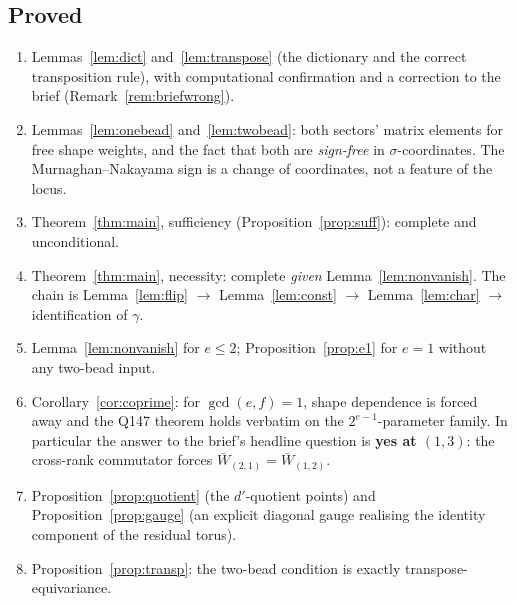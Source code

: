\documentclass[11pt]{article}
\theoremstyle{definition}
\theoremstyle{remark}
\begin{document}
\subsection*{Proved}
\begin{enumerate}
\item Lemmas~\ref{lem:dict} and~\ref{lem:transpose} (the dictionary and the correct
   transposition rule), with computational confirmation and a correction to the brief
   (Remark~\ref{rem:briefwrong}).
\item Lemmas~\ref{lem:onebead} and~\ref{lem:twobead}: both sectors' matrix elements for
   free shape weights, and the fact that both are \emph{sign-free} in
   $\sigma$-coordinates.  The Murnaghan--Nakayama sign is a change of coordinates,
   not a feature of the locus.
\item Theorem~\ref{thm:main}, sufficiency (Proposition~\ref{prop:suff}): complete and
   unconditional.
\item Theorem~\ref{thm:main}, necessity: complete \emph{given} Lemma~\ref{lem:nonvanish}.
   The chain is Lemma~\ref{lem:flip} $\to$ Lemma~\ref{lem:const} $\to$
   Lemma~\ref{lem:char} $\to$ identification of $\gamma$.
\item Lemma~\ref{lem:nonvanish} for $e\le2$; Proposition~\ref{prop:e1} for $e=1$ without
   any two-bead input.
\item Corollary~\ref{cor:coprime}: for $\gcd(e,f)=1$, shape dependence is forced away and
   the Q147 theorem holds verbatim on the $2^{e-1}$-parameter family.  In particular the
   answer to the brief's headline question is \textbf{yes at $(1,3)$}: the cross-rank
   commutator forces $\bar W_{(2,1)}=\bar W_{(1,2)}$.
\item Proposition~\ref{prop:quotient} (the $d'$-quotient points) and
   Proposition~\ref{prop:gauge} (an explicit diagonal gauge realising the identity
   component of the residual torus).
\item Proposition~\ref{prop:transp}: the two-bead condition is exactly
   transpose-equivariance.
\end{enumerate}
\end{document}

